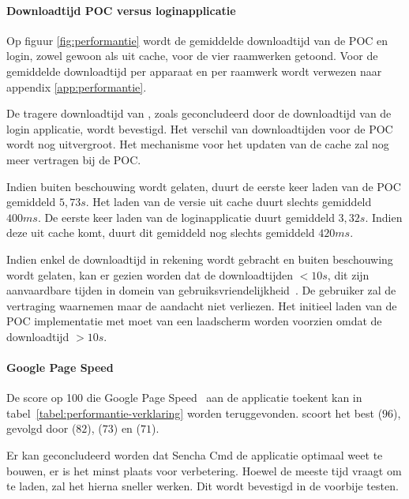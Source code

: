 \paragraph{Downloadtijd POC versus loginapplicatie}
Op figuur \ref{fig:performantie} wordt de gemiddelde downloadtijd van de POC en login, zowel gewoon als uit cache, voor de vier raamwerken getoond.
Voor de gemiddelde downloadtijd per apparaat en per raamwerk wordt verwezen naar appendix \ref{app:performantie}.


De tragere downloadtijd van \st{},  zoals geconcludeerd door de downloadtijd van de login applicatie, wordt bevestigd.
Het verschil van downloadtijden voor de POC wordt nog uitvergroot.
Het mechanisme voor het updaten van de cache zal \st{} nog meer vertragen bij de POC.

Indien \st{} buiten beschouwing wordt gelaten, duurt de eerste keer laden van de POC gemiddeld $5,73\unit{s}$. 
Het laden van de versie uit cache duurt slechts gemiddeld $400\unit{ms}$.
De eerste keer laden van de loginapplicatie duurt gemiddeld $3,32\unit{s}$.
Indien deze uit cache komt, duurt dit gemiddeld nog slechts gemiddeld $420\unit{ms}$.

Indien enkel de downloadtijd in rekening wordt gebracht en \st{} buiten beschouwing wordt gelaten, kan er gezien worden dat de downloadtijden $< 10\unit{s}$,  dit zijn aanvaardbare tijden in domein van gebruiksvriendelijkheid~\cite{Nielsen1993}.
De gebruiker zal de vertraging waarnemen maar de aandacht niet verliezen.
Het initieel laden van de POC implementatie met \st{} moet van een laadscherm worden voorzien omdat de downloadtijd $> 10\unit{s}$.


\paragraph{Google Page Speed}
De score op 100 die Google Page Speed~\cite{Morgan2011} aan de applicatie toekent kan in tabel~\ref{tabel:performantie-verklaring} worden teruggevonden.
\st{} scoort het best ($96$),  gevolgd door \lungo{} ($82$),  \kendo{}($73$) en \jqm{}($71$).

Er kan geconcludeerd worden dat Sencha Cmd de applicatie optimaal weet te bouwen,  er is het minst plaats voor verbetering.
Hoewel \st{} de meeste tijd vraagt om te laden, zal het hierna sneller werken.
Dit wordt bevestigd in de voorbije testen.

